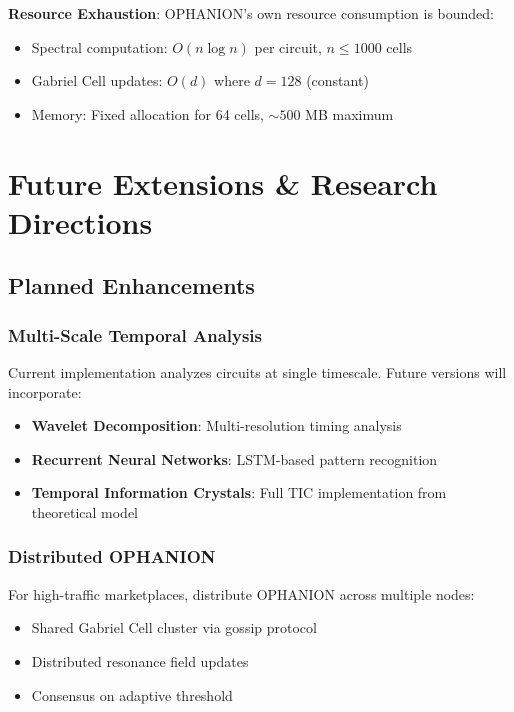 \documentclass[11pt,a4paper]{article}
\begin{document}
\textbf{Resource Exhaustion}:
OPHANION's own resource consumption is bounded:
\begin{itemize}
\item Spectral computation: $O(n \log n)$ per circuit, $n \leq 1000$ cells
\item Gabriel Cell updates: $O(d)$ where $d = 128$ (constant)
\item Memory: Fixed allocation for 64 cells, $\sim 500$ MB maximum
\end{itemize}

\newpage
\section{Future Extensions \& Research Directions}

\subsection{Planned Enhancements}

\subsubsection{Multi-Scale Temporal Analysis}

Current implementation analyzes circuits at single timescale. Future versions will incorporate:
\begin{itemize}
\item \textbf{Wavelet Decomposition}: Multi-resolution timing analysis
\item \textbf{Recurrent Neural Networks}: LSTM-based pattern recognition
\item \textbf{Temporal Information Crystals}: Full TIC implementation from theoretical model
\end{itemize}

\subsubsection{Distributed OPHANION}

For high-traffic marketplaces, distribute OPHANION across multiple nodes:
\begin{itemize}
\item Shared Gabriel Cell cluster via gossip protocol
\item Distributed resonance field updates
\item Consensus on adaptive threshold
\end{itemize}
\end{document}
